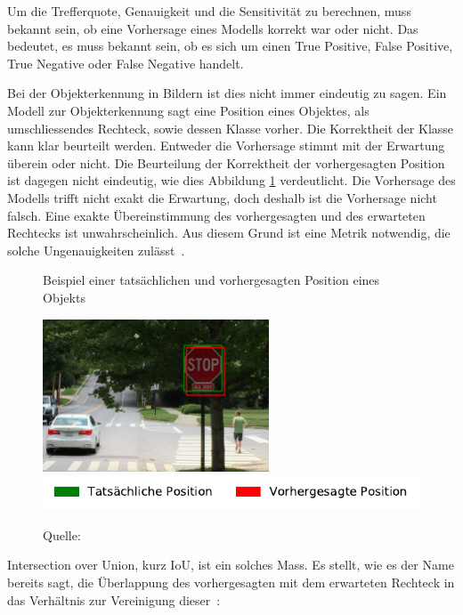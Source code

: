 Um die Trefferquote, Genauigkeit und die Sensitivität zu berechnen, muss bekannt sein, ob eine Vorhersage eines Modells korrekt war oder nicht. Das bedeutet, es muss bekannt sein, ob es sich um einen True Positive, False Positive, True Negative oder False Negative handelt. 

Bei der Objekterkennung in Bildern ist dies nicht immer eindeutig zu sagen. Ein Modell zur Objekterkennung sagt eine Position eines Objektes, als umschliessendes Rechteck, sowie dessen Klasse vorher. Die Korrektheit der Klasse kann klar beurteilt werden. Entweder die Vorhersage stimmt mit der Erwartung überein oder nicht. Die Beurteilung der Korrektheit der vorhergesagten Position ist dagegen nicht eindeutig, wie dies Abbildung \ref{fig:iou-issue} verdeutlicht. Die Vorhersage des Modells trifft nicht exakt die Erwartung, doch deshalb ist die Vorhersage nicht falsch. Eine exakte Übereinstimmung des vorhergesagten und des erwarteten Rechtecks ist unwahrscheinlich. Aus diesem Grund ist eine Metrik notwendig, die solche Ungenauigkeiten zulässt~\autocite{IoU}.

\begin{figure}[h!]
    \captionsetup{width=.9\linewidth}
    \caption{Beispiel einer tatsächlichen und vorhergesagten Position eines Objekts}
    \label{fig:iou-issue}
    \centering
    \includegraphics[width=0.6\textwidth]{graphics/iou/iou_issue.jpg}\\
    \includegraphics[scale=1]{graphics/matplot/iou_issue_legend.pdf}
    \caption*{Quelle: \textcite{IoU}}
\end{figure}

Intersection over Union, kurz IoU, ist ein solches Mass. Es stellt, wie es der Name bereits sagt, die Überlappung des vorhergesagten mit dem erwarteten Rechteck in das Verhältnis zur Vereinigung dieser~\autocite{IoU}:

